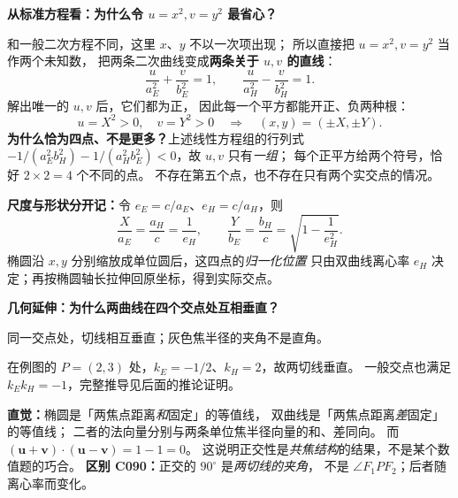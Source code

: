 \clearpage
\begin{explanationbox}
\textbf{从标准方程看：为什么令 $u=x^2,v=y^2$ 最省心？}

和一般二次方程不同，这里 $x$、$y$ 不以一次项出现；
所以直接把 $u=x^2,v=y^2$ 当作两个未知数，
把两条二次曲线变成\textbf{两条关于 $u,v$ 的直线}：
\[
\frac{u}{a_E^2}+\frac{v}{b_E^2}=1,\qquad
\frac{u}{a_H^2}-\frac{v}{b_H^2}=1.
\]
解出唯一的 $u,v$ 后，它们都为正，
因此每一个平方都能开正、负两种根：
\[
u=X^2>0,\quad v=Y^2>0
\quad\Longrightarrow\quad (x,y)=(\pm X,\pm Y).
\]
\textbf{为什么恰为四点、不是更多？}上述线性方程组的行列式
$-1/(a_E^2b_H^2)-1/(a_H^2b_E^2)<0$，故 $u,v$ 只有\emph{一组}；
每个正平方给两个符号，恰好 $2\times2=4$ 个不同的点。
不存在第五个点，也不存在只有两个实交点的情况。

\textbf{尺度与形状分开记：}令 $e_E=c/a_E$、$e_H=c/a_H$，则
\[
\frac{X}{a_E}=\frac{a_H}{c}=\frac1{e_H},\qquad
\frac{Y}{b_E}=\frac{b_H}{c}=\sqrt{1-\frac1{e_H^2}}.
\]
椭圆沿 $x,y$ 分别缩放成单位圆后，这四点的\emph{归一化位置}
只由双曲线离心率 $e_H$ 决定；再按椭圆轴长拉伸回原坐标，得到实际交点。
\end{explanationbox}

\clearpage
\begin{explanationbox}
\textbf{几何延伸：为什么两曲线在四个交点处互相垂直？}

\begin{center}


{\small 同一交点处，切线相互垂直；灰色焦半径的夹角不是直角。}
\end{center}
在例图的 $P=(2,3)$ 处，$k_E=-1/2$、$k_H=2$，故两切线垂直。
一般交点也满足 $k_Ek_H=-1$，完整推导见后面的推论证明。

\textbf{直觉：}椭圆是「两焦点距离\emph{和}固定」的等值线，
双曲线是「两焦点距离\emph{差}固定」的等值线；
二者的法向量分别与两条单位焦半径向量的和、差同向。
而 $(\mathbf u+\mathbf v)\cdot(\mathbf u-\mathbf v)=1-1=0$。
这说明正交性是\emph{共焦结构}的结果，不是某个数值题的巧合。
\textbf{区别 C090：}正交的 $90^\circ$ 是\emph{两切线的夹角}，
不是 $\angle F_1PF_2$；后者随离心率而变化。
\end{explanationbox}
